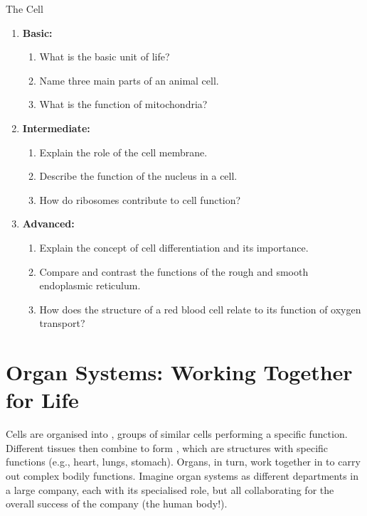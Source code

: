 \begin{tieredquestions}{The Cell}
\begin{enumerate}
    \item \textbf{Basic:}
    \begin{enumerate}
        \item What is the basic unit of life?
        \item Name three main parts of an animal cell.
        \item What is the function of mitochondria?
    \end{enumerate}
    \item \textbf{Intermediate:}
    \begin{enumerate}
        \item Explain the role of the cell membrane.
        \item Describe the function of the nucleus in a cell.
        \item How do ribosomes contribute to cell function?
    \end{enumerate}
    \item \textbf{Advanced:}
    \begin{enumerate}
        \item Explain the concept of cell differentiation and its importance.
        \item Compare and contrast the functions of the rough and smooth endoplasmic reticulum.
        \item How does the structure of a red blood cell relate to its function of oxygen transport?
    \end{enumerate}
\end{enumerate}
\end{tieredquestions}


\section{Organ Systems: Working Together for Life}

Cells are organised into , groups of similar cells performing a specific function. Different tissues then combine to form , which are structures with specific functions (e.g., heart, lungs, stomach). Organs, in turn, work together in  to carry out complex bodily functions.  Imagine organ systems as different departments in a large company, each with its specialised role, but all collaborating for the overall success of the company (the human body!).

